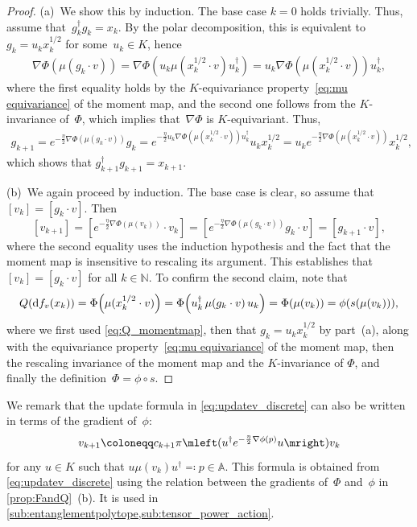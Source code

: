 \documentclass[11pt,letterpaper]{article}
\numberwithin{equation}{section}
\renewcommand{\AA}{\mathbb{A}}
\newcommand{\NN}{\mathbb{N}}
\newcommand{\diff}{\mathrm{d}}
\begin{document}
\begin{proof}
    (a)~We show this by induction.
    The base case $k=0$ holds trivially.
    Thus, assume that~$g_k^\dagger g_k = x_k$.
    By the polar decomposition, this is equivalent to $g_k = u_k x_k^{1/2}$ for some~$u_k \in K$, hence
    \begin{align}\label{eq:K cov grad phi}
        \nabla\Phi(\mu(g_k\cdot v))
        = \nabla\Phi(u_k\mu(x_k^{1/2}\cdot v)u_k^\dagger)
        = u_k\nabla\Phi(\mu(x_k^{1/2}\cdot v))u_k^\dagger,
    \end{align}
    where the first equality holds by the $K$-equivariance property~\eqref{eq:mu equivariance} of the moment map, and the second one follows from the $K$-invariance of~$\Phi$, which implies that~$\nabla\Phi$ is $K$-equivariant.
    Thus,
    \begin{align*}
        g_{k+1}
    = e^{-\frac\eta2 \nabla\Phi(\mu(g_k\cdot v))} g_k
    = e^{-\frac\eta2 u_k\nabla\Phi(\mu(x_k^{1/2}\cdot v))u_k^\dagger} u_k x_k^{1/2}
    = u_k e^{-\frac\eta2 \nabla\Phi(\mu(x_k^{1/2}\cdot v))} x_k^{1/2},
    \end{align*}
    which shows that $g_{k+1}^\dagger g_{k+1} = x_{k+1}$.

    (b)~We again proceed by induction.
    The base case is clear, so assume that $[v_k] = [g_k \cdot v]$.
    Then
    \[
        [v_{k+1}]
    = [e^{-\frac\eta2\nabla\Phi(\mu(v_k))} \cdot v_k]
    = [e^{-\frac\eta2\nabla\Phi(\mu(g_k \cdot v))} g_k \cdot v]
    = [g_{k+1} \cdot v],
    \]
    where the second equality uses the induction hypothesis and the fact that the moment map is insensitive to rescaling its argument.
    This establishes that $[v_k] = [g_k \cdot v]$ for all $k\in\NN$.
    To confirm the second claim, note that
    \begin{align}\label{eq:secondclaim}
        Q(\diff f_v(x_k))
    = \Phi\mleft(\mu(x_k^{1/2} \cdot v)\mright)
    = \Phi\mleft(u_k^\dagger \, \mu(g_k \cdot v) \, u_k\mright)
    = \Phi(\mu(v_k))
    = \phi(s(\mu(v_k))),
    \end{align}
    where we first used \cref{eq:Q_momentmap}, then that $g_k = u_k x_k^{1/2}$ by part~(a), along with the equivariance property~\eqref{eq:mu equivariance} of the moment map, then the rescaling invariance of the moment map and the $K$-invariance of $\Phi$, and finally the definition~$\Phi=\phi\circ s$.
\end{proof}

\noindent We remark that the update formula in \cref{eq:updatev_discrete} can also be written in terms of the gradient of~$\phi$:
\begin{equation}\label{eq:updatev_discrete phi}
    v_{k + 1} \coloneqq c_{k+1} \pi\mleft(u^\dagger e^{-\frac\eta2\nabla\phi(p)} u\mright)v_k
\end{equation}
for any $u \in K$ such that $u \mu(v_k) u^\dagger \eqqcolon p \in \AA$.
This formula is obtained from \cref{eq:updatev_discrete} using the relation between the gradients of~$\Phi$ and~$\phi$ in \cref{prop:FandQ}~(b).
It is used in \cref{sub:entanglementpolytope,sub:tensor_power_action}.
\end{document}
